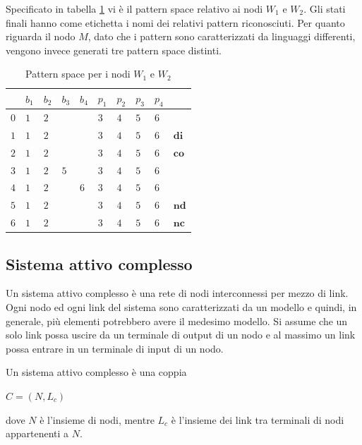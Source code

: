 \begin{ex}
Specificato in tabella \ref{tab:pts_w} vi è il pattern space relativo ai nodi $W_1$ e $W_2$. Gli stati finali hanno come etichetta i nomi dei relativi pattern riconosciuti.
Per quanto riguarda il nodo $M$, dato che i pattern sono caratterizzati da linguaggi differenti, vengono invece generati tre pattern space distinti.
\end{ex}

\begin{table}[htbp] 
\begin{tabularx}{\textwidth}{X | X X X X X X X X | X}
\hline
 & $b_1$ & $b_2$ & $b_3$ & $b_4$ & $p_1$ & $p_2$ & $p_3$ & $p_4$ & \\
\hline
$0$ & $1$ & $2$ &  &  & $3$ & $4$ & $5$ & $6$ & \\
$1$ & $1$ & $2$ &  &  & $3$ & $4$ & $5$ & $6$ & $\textbf{di}$\\
$2$ & $1$ & $2$ &  &  & $3$ & $4$ & $5$ & $6$ & $\textbf{co}$\\
$3$ & $1$ & $2$ & $5$ &  & $3$ & $4$ & $5$ & $6$ & \\
$4$ & $1$ & $2$ &  & $6$ & $3$ & $4$ & $5$ & $6$ & \\
$5$ & $1$ & $2$ &  &  & $3$ & $4$ & $5$ & $6$ & $\textbf{nd}$\\
$6$ & $1$ & $2$ &  &  & $3$ & $4$ & $5$ & $6$ & $\textbf{nc}$\\
\hline
\end{tabularx}
\caption{Pattern space per i nodi $W_1$ e $W_2$}
\label{tab:pts_w}
\end{table}

\subsection{Sistema attivo complesso}
Un sistema attivo complesso è una rete di nodi interconnessi per mezzo di link. Ogni nodo ed ogni link del sistema sono caratterizzati da un modello e quindi, in generale, più elementi potrebbero avere il medesimo modello. Si assume che un solo link possa uscire da un terminale di output di un nodo e al massimo un link possa entrare in un terminale di input di un nodo.

\begin{defn}
Un sistema attivo complesso è una coppia
\begin{center}
	$ C = (N,L_c)$
\end{center}
dove $N$ è l'insieme di nodi, mentre $L_c$ è l'insieme dei link tra terminali di nodi appartenenti a $N$.
\end{defn}


